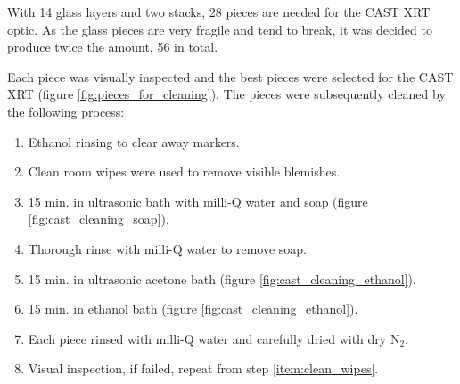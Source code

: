 With 14 glass layers and two stacks, 28 pieces are needed for the CAST XRT optic. As the glass pieces are very fragile and tend to break, it was decided to produce twice the amount, 56 in total.

Each piece was visually inspected and the best pieces were selected for the CAST XRT (figure \ref{fig:pieces_for_cleaning}). The pieces were subsequently cleaned by the following process:
\begin{enumerate}
  \item Ethanol rinsing to clear away markers.
  \item Clean room wipes were used to remove visible blemishes.\label{item:clean_wipes}
  \item 15 min. in ultrasonic bath with milli-Q water and soap (figure \ref{fig:cast_cleaning_soap}).
  \item Thorough rinse with milli-Q water to remove soap.
  \item 15 min. in ultrasonic acetone bath (figure \ref{fig:cast_cleaning_ethanol}).
  \item 15 min. in ethanol bath (figure \ref{fig:cast_cleaning_ethanol}).
  \item Each piece rinsed with milli-Q water and carefully dried with dry N$_2$.
  \item Visual inspection, if failed, repeat from step \ref{item:clean_wipes}.
\end{enumerate}

